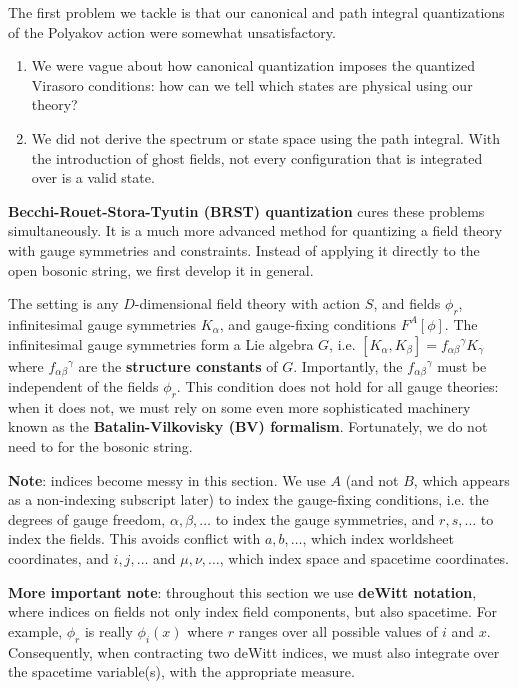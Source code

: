 \documentclass{report}
\theoremstyle{plain}
\theoremstyle{definition}
\theoremstyle{remark}
\begin{document}
The first problem we tackle is that our canonical and path integral
quantizations of the Polyakov action were somewhat unsatisfactory.
\begin{enumerate}
\item We were vague about how canonical quantization imposes the
  quantized Virasoro conditions: how can we tell which states are
  physical using our theory?
\item We did not derive the spectrum or state space using the path
  integral. With the introduction of ghost fields, not every
  configuration that is integrated over is a valid state.
\end{enumerate}
{\bf Becchi-Rouet-Stora-Tyutin (BRST) quantization} cures these
problems simultaneously. It is a much more advanced method for
quantizing a field theory with gauge symmetries and constraints.
Instead of applying it directly to the open bosonic string, we first
develop it in general.

The setting is any $D$-dimensional field theory with action $S$, and
fields $\phi_r$, infinitesimal gauge symmetries $K_\alpha$, and
gauge-fixing conditions $F^A[\phi]$. The infinitesimal gauge
symmetries form a Lie algebra $G$, i.e. $[K_\alpha, K_\beta] =
f_{\alpha\beta}{}^\gamma K_\gamma$ where $f_{\alpha\beta}{}^\gamma$
are the {\bf structure constants} of $G$. Importantly, the
$f_{\alpha\beta}{}^\gamma$ must be independent of the fields $\phi_r$.
This condition does not hold for all gauge theories: when it does not,
we must rely on some even more sophisticated machinery known as the
{\bf Batalin-Vilkovisky (BV) formalism}. Fortunately, we do not need
to for the bosonic string.

{\bf Note}: indices become messy in this section. We use $A$ (and not
$B$, which appears as a non-indexing subscript later) to index the
gauge-fixing conditions, i.e. the degrees of gauge freedom, $\alpha,
\beta, \ldots$ to index the gauge symmetries, and $r, s, \ldots$ to
index the fields. This avoids conflict with $a, b, \ldots$, which
index worldsheet coordinates, and $i, j, \ldots$ and $\mu, \nu,
\ldots$, which index space and spacetime coordinates.

{\bf More important note}: throughout this section we use {\bf deWitt
  notation}, where indices on fields not only index field components,
but also spacetime. For example, $\phi_r$ is really $\phi_i(x)$ where
$r$ ranges over all possible values of $i$ and $x$. Consequently, when
contracting two deWitt indices, we must also integrate over the
spacetime variable(s), with the appropriate measure.
\end{document}
